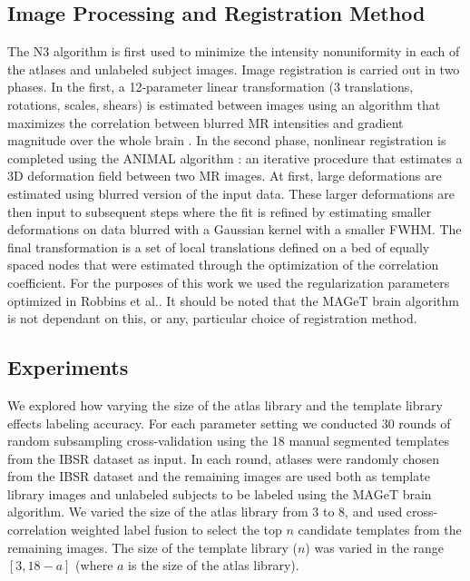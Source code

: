 \documentclass{article}
\newcommand{\magetbrain}{MAGeT brain }
\begin{document}
\subsection{Image Processing and Registration Method}
The N3 algorithm \cite{Sled1998} is first used to minimize the intensity
nonuniformity in each of the atlases and unlabeled subject images.  Image
registration is carried out in two phases.  In the first, a 12-parameter linear
transformation (3 translations, rotations, scales, shears) is estimated between
images using an algorithm that maximizes the correlation between blurred MR
intensities and gradient magnitude over the whole brain \cite{Collins}.  In the
second phase, nonlinear registration is completed using the ANIMAL algorithm
\cite{Collins1995}: an iterative procedure that estimates a 3D deformation
field between two MR images. At first, large deformations are estimated using
blurred version of the input data. These larger deformations are then input to
subsequent steps where the fit is refined by estimating smaller deformations on
data blurred with a Gaussian kernel with a smaller FWHM. The final
transformation is a set of local translations defined on a bed of equally
spaced nodes that were estimated through the optimization of the correlation
coefficient. For the purposes of this work we used the regularization
parameters optimized in Robbins et al.\cite{Robbins2004}. It should be
noted that the \magetbrain algorithm is not dependant on this, or any,
particular choice of registration method\cite{Chakravarty2011}.

\subsection{Experiments}

We explored how varying the size of the atlas library and the template library
effects labeling accuracy.  For each parameter setting we conducted 30 rounds
of random subsampling cross-validation using the 18 manual segmented templates
from the IBSR dataset as input. In each round, atlases were randomly chosen
from the IBSR dataset and the remaining images are used both as template
library images and unlabeled subjects to be labeled using the \magetbrain
algorithm.  We varied the size of the atlas library from 3 to 8, and used
cross-correlation weighted label fusion to select the top $n$ candidate
templates from the remaining images.  The size of the template library ($n$)
was varied in the range $[3, 18-a]$ (where $a$ is the size of the atlas
library).
\end{document}
